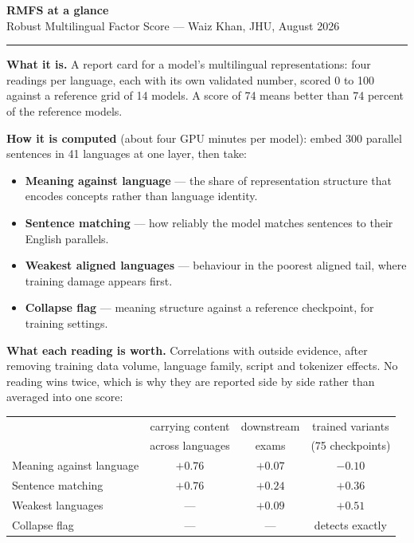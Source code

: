 \documentclass[10pt]{article}
\begin{document}
\begin{center}
{\LARGE\textbf{RMFS at a glance}}\\[2pt]
{\small Robust Multilingual Factor Score --- Waiz Khan, JHU,
August 2026}
\end{center}
\vspace{-4pt}\hrule\vspace{6pt}

\textbf{What it is.} A report card for a model's multilingual
representations: four readings per language, each with its own
validated number, scored 0 to 100 against a reference grid of 14
models. A score of 74 means better than 74 percent of the reference
models.

\textbf{How it is computed} (about four GPU minutes per model): embed
300 parallel sentences in 41 languages at one layer, then take:
\begin{itemize}
\item \textbf{Meaning against language} --- the share of representation
structure that encodes concepts rather than language identity.
\item \textbf{Sentence matching} --- how reliably the model matches
sentences to their English parallels.
\item \textbf{Weakest aligned languages} --- behaviour in the poorest
aligned tail, where training damage appears first.
\item \textbf{Collapse flag} --- meaning structure against a reference
checkpoint, for training settings.
\end{itemize}

\textbf{What each reading is worth.} Correlations with outside
evidence, after removing training data volume, language family, script
and tokenizer effects. No reading wins twice, which is why they are
reported side by side rather than averaged into one score:
\begin{center}\small
\begin{tabular}{lccc}
\toprule
 & carrying content & downstream & trained variants\\
 & across languages & exams & (75 checkpoints)\\
\midrule
Meaning against language & $\mathbf{+0.76}$ & $+0.07$ & $-0.10$\\
Sentence matching & $+0.76$ & $\mathbf{+0.24}$ & $+0.36$\\
Weakest languages & --- & $+0.09$ & $\mathbf{+0.51}$\\
Collapse flag & --- & --- & detects exactly\\
\bottomrule
\end{tabular}
\end{center}
\end{document}

